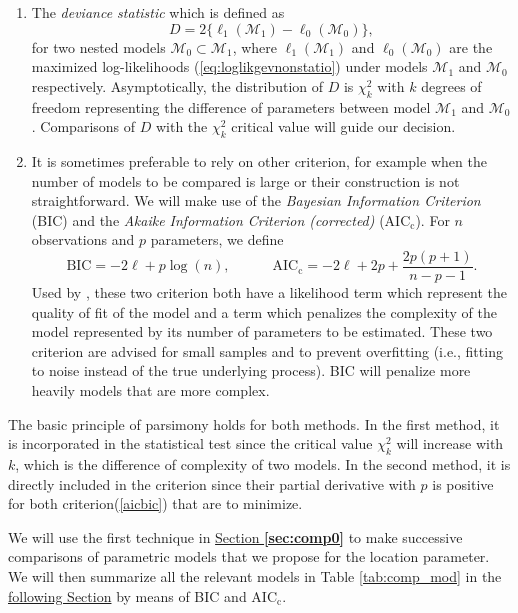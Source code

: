 \begin{enumerate}
	\item The \emph{deviance statistic} which is defined as 
	\begin{equation}
	D = 2\big\{\ell_1(\mathcal{M}_1)-\ell_0(\mathcal{M}_0)\big\},
	\end{equation}
	for two nested models $\mathcal{M}_0\subset \mathcal{M}_1$, where $\ell_1(\mathcal{M}_1)$ and $\ell_0(\mathcal{M}_0)$ are the maximized log-likelihoods (\ref{eq:loglikgevnonstatio}) under models $\mathcal{M}_1$ and $\mathcal{M}_0$ respectively.
	Asymptotically, the distribution of $D$ is $\chi^2_k$ with $k$ degrees of freedom representing the difference of parameters between model $\mathcal{M}_1$ and $\mathcal{M}_0$. Comparisons of $D$ with the $\chi^2_k$ critical value will guide our decision.  
	
	\item\label{i:aicbic} It is sometimes preferable to rely on other criterion, for example when the number of models to be compared is large or their construction is not straightforward. We will make use of the \emph{Bayesian Information Criterion} (BIC) and  the \emph{Akaike Information Criterion (corrected) } ($\text{AIC}_{\text{c}}$). For $n$ observations and $p$ parameters, 
we define 
	\begin{equation}\label{aicbic}
\text{BIC} = -2\ell+ p\log(n), \qquad\quad \text{AIC}_{\text{c}}=-2\ell+2p+\frac{2p(p+1)}{n-p-1}.
	\end{equation}
	 Used by \citet{cannon_flexible_2010}, these two criterion both have a likelihood term which represent the quality of fit of the model and a term which penalizes the complexity of the model represented by its number of parameters to be estimated. These two criterion are advised for small samples and to prevent overfitting (i.e., fitting to noise instead of the true underlying process). BIC will penalize more heavily models that are more complex.
\end{enumerate}
The basic principle of parsimony holds for both methods. In the first method, it is incorporated in the statistical test since the critical value $\chi^2_k$ will increase with $k$, which is the difference of complexity of two models. In the second method, it is directly included in the criterion since their partial derivative with $p$ is positive for both criterion(\ref{aicbic}) that are to minimize. %

We will use the first technique in \hyperref[sec:comp0]{Section \textbf{\ref{sec:comp0}}} to make successive comparisons of parametric models that we propose for the location parameter. We will then summarize all the relevant models in Table \ref{tab:comp_mod} in the \hyperref[sec:nnxp]{following Section} by means of BIC and $\text{AIC}_{\text{c}}$.


